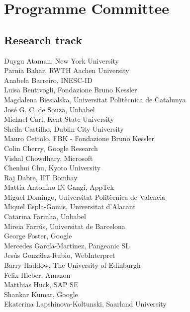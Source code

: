 \documentclass[a4paper,11pt,twoside]{book}
\begin{document}
\section*{Programme Committee}
\subsection*{Research track}

\noindent Duygu Ataman, New York University\\
\noindent Parnia Bahar, RWTH Aachen University\\
\noindent Anabela Barreiro, INESC-ID\\
\noindent Luisa Bentivogli, Fondazione Bruno Kessler\\
\noindent Magdalena Biesialska, Universitat Politècnica de Catalunya\\
\noindent José G. C. de Souza, Unbabel\\
\noindent Michael Carl, Kent State University\\
\noindent Sheila Castilho, Dublin City University\\
\noindent Mauro Cettolo, FBK - Fondazione Bruno Kessler\\
\noindent Colin Cherry, Google Research\\
\noindent Vishal Chowdhary, Microsoft\\
\noindent Chenhui Chu, Kyoto University\\
\noindent Raj Dabre, IIT Bombay\\
\noindent Mattia Antonino Di Gangi, AppTek\\
\noindent Miguel Domingo, Universitat Politècnica de València\\
\noindent Miquel Espla-Gomis, Universitat d'Alacant\\
\noindent Catarina Farinha, Unbabel\\
\noindent Mireia Farrús, Universitat de Barcelona\\
\noindent George Foster, Google\\
\noindent Mercedes García-Martínez, Pangeanic SL\\
\noindent Jesús González-Rubio, WebInterpret\\
\noindent Barry Haddow, The University of Edinburgh\\
\noindent Felix Hieber, Amazon\\
\noindent Matthias Huck, SAP SE\\
\noindent Shankar Kumar, Google\\
\noindent Ekaterina Lapshinova-Koltunski, Saarland University\\
\end{document}
